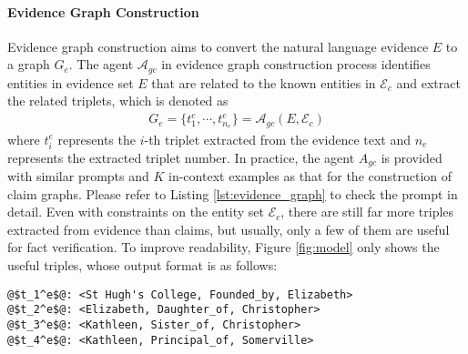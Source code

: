 
    
\paragraph{Evidence Graph Construction}
Evidence graph construction aims to convert the natural language evidence $E$ to a graph $G_e$. The agent $\mathcal{A}_{gc}$ in evidence graph construction process identifies entities in evidence set $E$ that are related to the known entities in $\mathcal{E}_c$ and extract the related triplets, which is denoted as
\begin{align}
    G_e = \{t^e_1, \cdots, t^e_{n_e}\} = \mathcal{A}_{gc}(E, \mathcal{E}_c)
\end{align}
where $t_i^e$ represents the $i$-th triplet extracted from the evidence text and $n_e$ represents the extracted triplet number. In practice, the agent $A_{gc}$ is provided with similar prompts and $K$ in-context examples as that for the construction of claim graphs. Please refer to Listing \ref{lst:evidence_graph} to check the prompt in detail. Even with constraints on the entity set $\mathcal{E}_c$, there are still far more triples extracted from evidence than claims, but usually, only a few of them are useful for fact verification. To improve readability, Figure \ref{fig:model} only shows the useful triples, whose output format is as follows:
\begin{lstlisting}[style=myStyle*]
@$t_1^e$@: <St Hugh's College, Founded_by, Elizabeth>
@$t_2^e$@: <Elizabeth, Daughter_of, Christopher>
@$t_3^e$@: <Kathleen, Sister_of, Christopher>
@$t_4^e$@: <Kathleen, Principal_of, Somerville>
\end{lstlisting}

